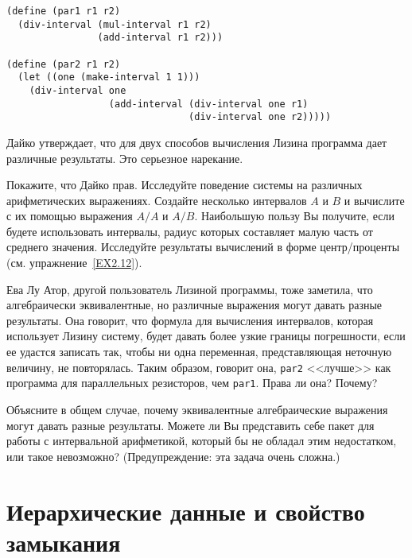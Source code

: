 \begin{Verbatim}[fontsize=\small]
(define (par1 r1 r2)
  (div-interval (mul-interval r1 r2)
                (add-interval r1 r2)))

(define (par2 r1 r2)
  (let ((one (make-interval 1 1))) 
    (div-interval one
                  (add-interval (div-interval one r1)
                                (div-interval one r2)))))
\end{Verbatim}
Дайко утверждает, что для двух способов вычисления Лизина программа
дает различные результаты.  Это серьезное нарекание.
\begin{exercise}{2.14}\label{EX2.14}%
Покажите, что Дайко прав.  Исследуйте поведение системы на
различных арифметических выражениях.  Создайте несколько интервалов
$A$ и $B$ и вычислите с их помощью выражения
$A/A$ и $A/B$.  Наибольшую пользу Вы получите,
если будете использовать интервалы, радиус которых составляет малую
часть от среднего значения.  Исследуйте результаты вычислений в форме
центр/проценты (см. упражнение~\ref{EX2.12}).
\end{exercise}
\begin{exercise}{2.15}\label{EX2.15}%
Ева Лу Атор, другой пользователь Лизиной программы, тоже заметила, что
алгебраически эквивалентные, но различные выражения могут давать
разные результаты.  Она говорит, что формула для вычисления интервалов, 
которая использует Лизину систему, будет давать более узкие границы
погрешности, если ее удастся записать так, чтобы ни одна переменная,
представляющая неточную величину, не повторялась.  Таким образом,
говорит она, {\tt par2} <<лучше>> как программа для
параллельных резисторов, чем {\tt par1}.  Права ли она? Почему?
\end{exercise}
\begin{exercise}{2.16}\label{EX2.16}%
Объясните в общем случае, почему эквивалентные
алгебраические выражения могут давать разные результаты.  Можете ли Вы 
представить себе пакет для работы с интервальной арифметикой, который
бы не обладал этим недостатком, или такое невозможно?
(Предупреждение: эта задача очень сложна.)
\end{exercise}

\section{Иерархические данные и свойство замыкания}
\label{HIERARCHICAL-DATA-AND-THE-CLOSURE-PROPERTY}


